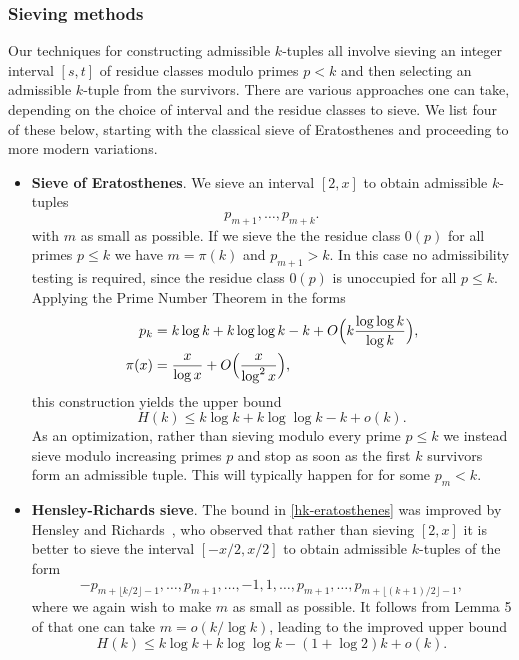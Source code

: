 \subsubsection{Sieving methods}

Our techniques for constructing admissible $k$-tuples all involve sieving an integer interval $[s,t]$ of residue classes modulo primes $p < k$ and then selecting an admissible $k$-tuple from the survivors.  There are various approaches one can take, depending on the choice of interval and the residue classes to sieve.
We list four of these below, starting with the classical sieve of Eratosthenes and proceeding to more modern variations.

\begin{itemize}
\item\textbf{Sieve of Eratosthenes}.
We sieve an interval $[2,x]$ to obtain admissible $k$-tuples
\[
p_{m+1},\ldots,p_{m+k}.
\]
with $m$ as small as possible.
If we sieve the the residue class $0(p)$ for all primes $p\le k$ we have $m=\pi(k)$ and $p_{m+1}>k$. In this case no admissibility testing is required, since the residue class $0(p)$ is unoccupied for all $p \le k$.
Applying the Prime Number Theorem in the forms
\begin{align*}
p_k &=k \log k+ k \log \log k - k +O\Bigl(k \frac{ \log \log k}{\log k} \Bigr),\\
\pi(x)&=\frac{x}{\log x}+O\Bigl(\frac{x}{\log^2 x}\Bigr),
\end{align*}
this construction yields the upper bound
\begin{equation}\label{hk-eratosthenes}
H(k)\le k\log k + k\log\log k  - k + o(k).
\end{equation}
As an optimization, rather than sieving modulo every prime $p \le k$ we instead sieve modulo increasing primes $p$ and stop as soon as the first $k$ survivors form an admissible tuple.
This will typically happen for for some $p_m < k$.
\smallbreak

\item\textbf{Hensley-Richards sieve}.
The bound in \eqref{hk-eratosthenes} was improved by Hensley and Richards~\cite{hensley,
  hensley-2, richards}, who observed that rather than sieving $[2,x]$ it is better to sieve the interval $[-x/2,x/2]$ to obtain admissible $k$-tuples of the form
\[
-p_{m+\lfloor k/2\rfloor-1},\ldots,p_{m+1},\ldots,-1,1,\ldots,p_{m+1},\ldots,p_{m+\lfloor(k+1)/2\rfloor-1},
\]
where we again wish to make $m$ as small as possible.
It follows from Lemma 5 of \cite{hensley-2} that one can take $m=o(k/\log k)$, leading to the improved upper bound
\begin{equation}\label{hk-hensely-richards}
H(k)\le k\log k + k\log\log k -(1+\log 2)k + o(k).
\end{equation}
\smallbreak


\end{itemize}

